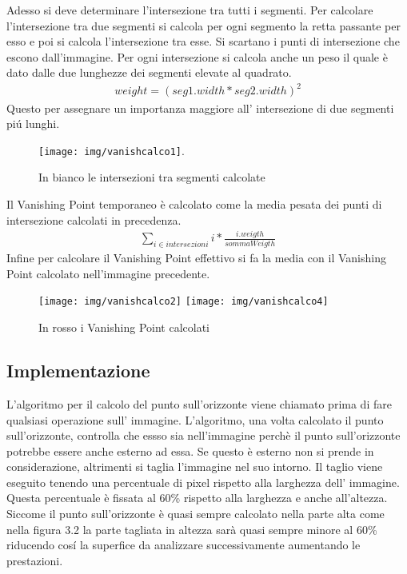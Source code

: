 		Adesso si deve determinare l'intersezione tra tutti i segmenti. Per calcolare l'intersezione tra due segmenti si calcola per ogni segmento la retta passante per esso e poi si calcola l'intersezione tra esse. Si scartano i punti di intersezione che escono dall'immagine. Per ogni intersezione si calcola anche un peso il quale è dato dalle due lunghezze dei segmenti elevate al quadrato.
		\begin{align*}
			weight = (seg1.width * seg2.width)^{2}
		\end{align*}
		Questo per assegnare un importanza maggiore all' intersezione di due segmenti pi\'u lunghi.
		\begin{figure}[!ht]
			\centering
			\texttt{[image: img/vanishcalco1]}.
			\caption[Intersezioni dei segmenti]{In bianco le intersezioni tra segmenti calcolate}
		\end{figure}
		Il Vanishing Point temporaneo è calcolato come la media pesata dei punti di intersezione calcolati in precedenza.
		\begin{align*}
			\sum\limits_{i \in intersezioni} i * \frac{i.weigth}{sommaWeigth}
		\end{align*}
		Infine per calcolare il Vanishing Point effettivo si fa la media con il Vanishing Point calcolato nell'immagine precedente.

		\begin{figure}[!ht]
			\centering
			\texttt{[image: img/vanishcalco2]}
			\hspace{7mm}
			\texttt{[image: img/vanishcalco4]}
			\caption[Vanishing Point calcolati]{In rosso i Vanishing Point calcolati}
		\end{figure}

	\subsection{Implementazione}
		L'algoritmo per il calcolo del punto sull'orizzonte viene chiamato prima di fare qualsiasi operazione sull' immagine. L'algoritmo, una volta calcolato il punto sull'orizzonte, controlla che essso sia nell'immagine perchè il punto sull'orizzonte potrebbe essere anche esterno ad essa. Se questo è esterno non si prende in considerazione, altrimenti si taglia l'immagine nel suo intorno. Il taglio viene eseguito tenendo una percentuale di pixel rispetto alla larghezza dell' immagine. Questa percentuale è fissata al 60\% rispetto alla larghezza e anche all'altezza. Siccome il punto sull'orizzonte è quasi sempre calcolato nella parte alta come nella figura 3.2 la parte tagliata in altezza sarà quasi sempre minore al 60\% riducendo cos\'i la superfice da analizzare successivamente aumentando le prestazioni. 

